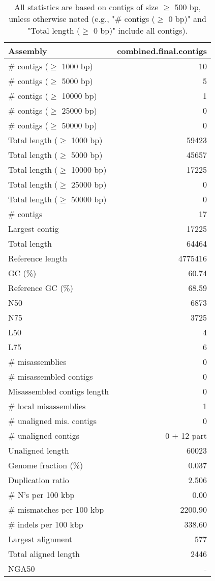 \documentclass[12pt,a4paper]{article}
\begin{document}
\begin{table}[ht]
\begin{center}
\caption{All statistics are based on contigs of size $\geq$ 500 bp, unless otherwise noted (e.g., "\# contigs ($\geq$ 0 bp)" and "Total length ($\geq$ 0 bp)" include all contigs).}
\begin{tabular}{|l*{1}{|r}|}
\hline
Assembly & combined.final.contigs \\ \hline
\# contigs ($\geq$ 1000 bp) & 10 \\ \hline
\# contigs ($\geq$ 5000 bp) & 5 \\ \hline
\# contigs ($\geq$ 10000 bp) & 1 \\ \hline
\# contigs ($\geq$ 25000 bp) & 0 \\ \hline
\# contigs ($\geq$ 50000 bp) & 0 \\ \hline
Total length ($\geq$ 1000 bp) & 59423 \\ \hline
Total length ($\geq$ 5000 bp) & 45657 \\ \hline
Total length ($\geq$ 10000 bp) & 17225 \\ \hline
Total length ($\geq$ 25000 bp) & 0 \\ \hline
Total length ($\geq$ 50000 bp) & 0 \\ \hline
\# contigs & 17 \\ \hline
Largest contig & 17225 \\ \hline
Total length & 64464 \\ \hline
Reference length & 4775416 \\ \hline
GC (\%) & 60.74 \\ \hline
Reference GC (\%) & 68.59 \\ \hline
N50 & 6873 \\ \hline
N75 & 3725 \\ \hline
L50 & 4 \\ \hline
L75 & 6 \\ \hline
\# misassemblies & 0 \\ \hline
\# misassembled contigs & 0 \\ \hline
Misassembled contigs length & 0 \\ \hline
\# local misassemblies & 1 \\ \hline
\# unaligned mis. contigs & 0 \\ \hline
\# unaligned contigs & 0 + 12 part \\ \hline
Unaligned length & 60023 \\ \hline
Genome fraction (\%) & 0.037 \\ \hline
Duplication ratio & 2.506 \\ \hline
\# N's per 100 kbp & 0.00 \\ \hline
\# mismatches per 100 kbp & 2200.90 \\ \hline
\# indels per 100 kbp & 338.60 \\ \hline
Largest alignment & 577 \\ \hline
Total aligned length & 2446 \\ \hline
NGA50 & - \\ \hline
\end{tabular}
\end{center}
\end{table}
\end{document}
